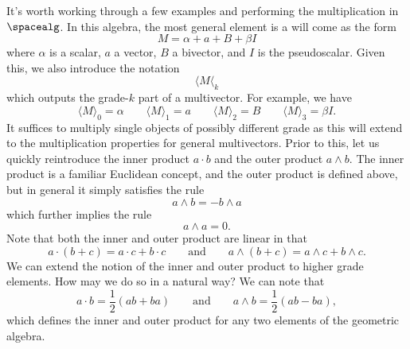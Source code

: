 It's worth working through a few examples and performing the multiplication in $\spacealg$.  In this algebra, the most general element is a  will come as the form
\[
M = \alpha + a + B + \beta I
\]
where $\alpha$ is a scalar, $a$ a vector, $B$ a bivector, and $I$ is the pseudoscalar. Given this, we also introduce the notation
\[
\langle M \langle_k 
\]
which outputs the grade-$k$ part of a multivector. For example, we have
\[
\langle M \rangle_0 = \alpha \qquad \langle M \rangle_1 = a \qquad \langle M \rangle_2 = B \qquad \langle M \rangle_3 = \beta I.   
\]
It suffices to multiply single objects of possibly different grade as this will extend to the multiplication properties for general multivectors. Prior to this, let us quickly reintroduce the inner product $a\cdot b$ and the outer product $a\wedge b$.  The inner product is a familiar Euclidean concept, and the outer product is defined above, but in general it simply satisfies the rule
\[
a\wedge b = -b\wedge a
\]
which further implies the rule
\[
a\wedge a = 0.
\]
Note that both the inner and outer product are linear in that
\[
a\cdot(b+ c) = a\cdot c + b \cdot c \qquad \textrm{and} \qquad a\wedge(b+c) = a \wedge c + b \wedge c.
\]
We can extend the notion of the inner and outer product to higher grade elements. How may we do so in a natural way? We can note that
\[
a\cdot b = \frac{1}{2}(ab + ba) \qquad \textrm{and} \qquad a\wedge b = \frac{1}{2}(ab-ba),
\]
which defines the inner and outer product for any two elements of the geometric algebra.

